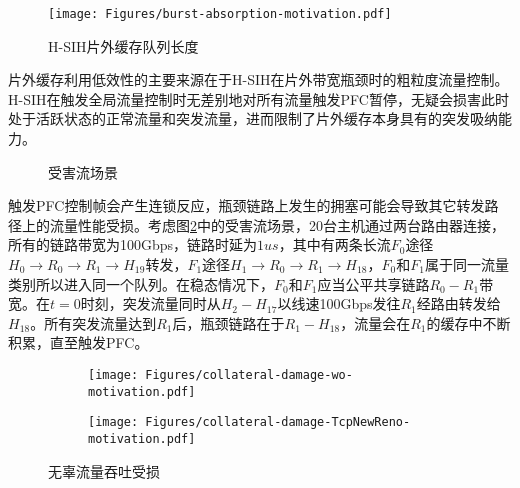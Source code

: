 \begin{figure}[H]
  \centering
  \texttt{[image: Figures/burst-absorption-motivation.pdf]}
  \caption{H-SIH片外缓存队列长度}
  \label{c4:s1:ss1:fig:dram qlen motivation}
\end{figure}

片外缓存利用低效性的主要来源在于H-SIH在片外带宽瓶颈时的粗粒度流量控制。H-SIH在触发全局流量控制时无差别地对所有流量触发PFC暂停，无疑会损害此时处于活跃状态的正常流量和突发流量，进而限制了片外缓存本身具有的突发吸纳能力。



\begin{figure}[H]
  \centering
  \resizebox{0.6\linewidth}{!}{}
  \caption{受害流场景}
  \label{c4:s1:ss1:fig:victim flow scenario}
\end{figure}

触发PFC控制帧会产生连锁反应，瓶颈链路上发生的拥塞可能会导致其它转发路径上的流量性能受损。考虑图\ref{c4:s1:ss1:fig:victim flow scenario}中的受害流场景，20台主机通过两台路由器连接，所有的链路带宽为100Gbps，链路时延为$1us$，其中有两条长流$F_0$途径$H_0 \rightarrow R_0 \rightarrow R_1 \rightarrow H_{19}$转发，$F_1$途径$H_1 \rightarrow R_0 \rightarrow R_1 \rightarrow H_{18}$，$F_0$和$F_1$属于同一流量类别所以进入同一个队列。在稳态情况下，$F_0$和$F_1$应当公平共享链路$R_0-R_1$带宽。在$t=0$时刻，突发流量同时从$H_2-H_{17}$以线速100Gbps发往$R_1$经路由转发给$H_{18}$。所有突发流量达到$R_1$后，瓶颈链路在于$R_1-H_{18}$，流量会在$R_1$的缓存中不断积累，直至触发PFC。

\begin{figure}[H]
  \begin{subfigure}[b]{0.49\linewidth}
      \centering
      \texttt{[image: Figures/collateral-damage-wo-motivation.pdf]}
      \label{c3:s6:ss1:fig:sub1:f0 throughput w/o cc}
  \end{subfigure}
  \begin{subfigure}[b]{0.49\linewidth}
      \centering
      \texttt{[image: Figures/collateral-damage-TcpNewReno-motivation.pdf]}
      \label{c3:s6:ss1:fig:sub1:throughput of f0 new reno}
  \end{subfigure}
  \caption{无辜流量吞吐受损}
  \label{c3:s6:ss1:fig:throughput damage}
\end{figure}

